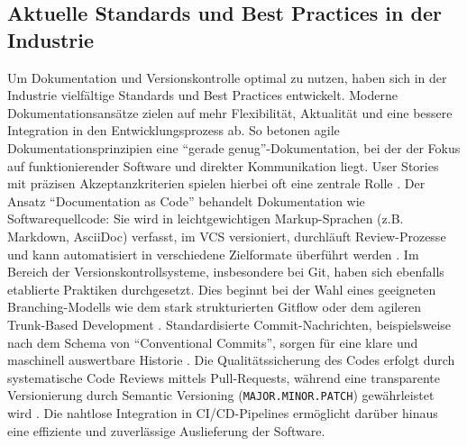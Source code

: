 \documentclass[12pt,oneside]{article}
\begin{document}
    \subsection{Aktuelle Standards und Best Practices in der Industrie}
    \label{subsec:standards}
    Um Dokumentation und Versionskontrolle optimal zu nutzen, haben sich in der Industrie vielfältige Standards und Best Practices entwickelt.
    \newline
    Moderne Dokumentationsansätze zielen auf mehr Flexibilität, Aktualität und eine bessere Integration in den Entwicklungsprozess ab. So betonen agile Dokumentationsprinzipien eine ``gerade genug''-Dokumentation, bei der der Fokus auf funktionierender Software und direkter Kommunikation liegt. User Stories mit präzisen Akzeptanzkriterien spielen hierbei oft eine zentrale Rolle \cite{AgileManifestoDe, fraunhoferIESE2020agilMytho}. Der Ansatz ``Documentation as Code'' behandelt Dokumentation wie Softwarequellcode: Sie wird in leichtgewichtigen Markup-Sprachen (z.B. Markdown, AsciiDoc) verfasst, im VCS versioniert, durchläuft Review-Prozesse und kann automatisiert in verschiedene Zielformate überführt werden \cite{WriteTheDocsWhatIsDocsAsCode}.
    \newline
    Im Bereich der Versionskontrollsysteme, insbesondere bei Git, haben sich ebenfalls etablierte Praktiken durchgesetzt. Dies beginnt bei der Wahl eines geeigneten Branching-Modells wie dem stark strukturierten Gitflow oder dem agileren Trunk-Based Development \cite{AtlassianGitWorkflows}. Standardisierte Commit-Nachrichten, beispielsweise nach dem Schema von ``Conventional Commits'', sorgen für eine klare und maschinell auswertbare Historie \cite{ConventionalCommitsOrgDe}. Die Qualitätssicherung des Codes erfolgt durch systematische Code Reviews mittels Pull-Requests, während eine transparente Versionierung durch Semantic Versioning (\texttt{MAJOR.MINOR.PATCH}) gewährleistet wird \cite{AtlassianWasIstEinPullRequest, SemVerOrgDe}. Die nahtlose Integration in CI/CD-Pipelines ermöglicht darüber hinaus eine effiziente und zuverlässige Auslieferung der Software.
\end{document}
